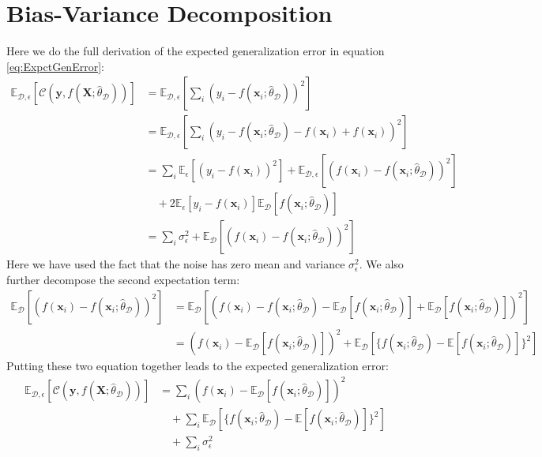 \documentclass[a4paper, american, 12pt]{report}
\begin{document}
	\chapter{Bias-Variance Decomposition}
	\label{appendix:BiasVarianceDecomp}
	Here we do the full derivation of the expected generalization error in equation \ref{eq:ExpctGenError}:
	\begin{align*}
		\mathds{E}_{\mathcal{D},\epsilon}[\mathcal{C}(\textbf{y},f(\textbf{X};\hat{\theta}_{\mathcal{D}}))]
		&=\mathds{E}_{\mathcal{D},\epsilon}\left[\sum_{i}(y_i-f(\textbf{x}_i;\hat{\theta}_{\mathcal{D}}))^2\right]\\
		&=\mathds{E}_{\mathcal{D},\epsilon}\left[\sum_{i}(y_i-f(\textbf{x}_i;\hat{\theta}_{\mathcal{D}})-f(\textbf{x}_i)+f(\textbf{x}_i))^2\right]\\
		&=\sum_{i} \mathds{E}_{\epsilon}[(y_i-f(\textbf{x}_i))^2]+\mathds{E}_{\mathcal{D},\epsilon}[(f(\textbf{x}_i)-f(\textbf{x}_i;\hat{\theta}_{\mathcal{D}}))^2]\\
		&\quad+2\mathds{E}_{\epsilon}[y_i-f(\textbf{x}_i)]\mathds{E}_{\mathcal{D}}[f(\textbf{x}_i;\hat{\theta}_{\mathcal{D}})]\\
		&=\sum_{i}\sigma_{\epsilon}^2+\mathds{E}_{\mathcal{D}}[(f(\textbf{x}_i)-f(\textbf{x}_i;\hat{\theta}_{\mathcal{D}}))^2]
	\end{align*}
	Here we have used the fact that the noise has zero mean and variance $\sigma_{\epsilon}^2$. We also further decompose the second expectation term:
	\begin{align*}
		\mathds{E}_{\mathcal{D}}[(f(\textbf{x}_i)-f(\textbf{x}_i;\hat{\theta}_{\mathcal{D}}))^2]
		&=\mathds{E}_{\mathcal{D}}\left[(f(\textbf{x}_i)-f(\textbf{x}_i;\hat{\theta}_{\mathcal{D}})-\mathds{E}_{\mathcal{D}}[f(\textbf{x}_i;\hat{\theta}_{\mathcal{D}})]+ \mathds{E}_{\mathcal{D}}[f(\textbf{x}_i;\hat{\theta}_{\mathcal{D}})])^2\right]\\
		&=(f(\textbf{x}_i)-\mathds{E}_{\mathcal{D}}[f(\textbf{x}_i;\hat{\theta}_{\mathcal{D}})])^2+ \mathds{E}_{\mathcal{D}}[\{f(\textbf{x}_i;\hat{\theta}_{\mathcal{D}})-\mathds{E}[f(\textbf{x}_i;\hat{\theta}_{\mathcal{D}})]\}^2]
	\end{align*}
	Putting these two equation together leads to the expected generalization error:
	\begin{align*}
		\mathds{E}_{\mathcal{D},\epsilon}[\mathcal{C}(\textbf{y}, f(\textbf{X};\hat{\theta}_{\mathcal{D}}))]
		&=\sum_i(f(\textbf{x}_i)-\mathds{E}_{\mathcal{D}}[f(\textbf{x}_i;\hat{\theta}_{\mathcal{D}})])^2 \\
		& \quad +\sum_i \mathds{E}_{\mathcal{D}}[\{f(\textbf{x}_i;\hat{\theta}_{\mathcal{D}})-\mathds{E}[f(\textbf{x}_i;\hat{\theta}_{\mathcal{D}})]\}^2]\\
		& \quad + \sum_{i}\sigma_{\epsilon}^2
	\end{align*}
\end{document}
